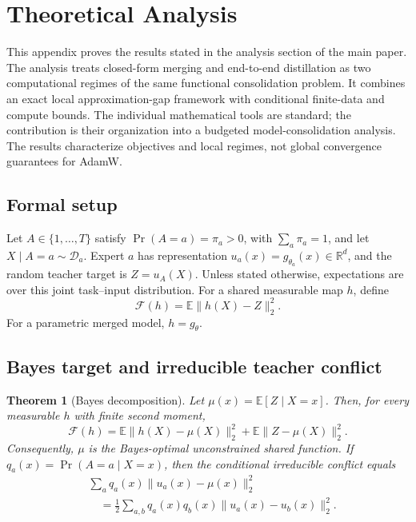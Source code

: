 \documentclass[letterpaper]{article} %
\theoremstyle{plain}
\newtheorem{theorem}{Theorem}
\theoremstyle{definition}
\begin{document}
\section{Theoretical Analysis}
\label{app:theory}

This appendix proves the results stated in the analysis section of the main paper.
The analysis treats closed-form merging and end-to-end distillation as two computational regimes of the same functional consolidation problem.
It combines an exact local approximation-gap framework with conditional finite-data and compute bounds.
The individual mathematical tools are standard; the contribution is their organization into a budgeted model-consolidation analysis.
The results characterize objectives and local regimes, not global convergence guarantees for AdamW.

\subsection{Formal setup}
Let $A\in\{1,\ldots,T\}$ satisfy $\Pr(A=a)=\pi_a>0$, with $\sum_a\pi_a=1$, and let $X\mid A=a\sim\mathcal D_a$.
Expert $a$ has representation $u_a(x)=g_{\theta_a}(x)\in\mathbb R^d$, and the random teacher target is $Z=u_A(X)$.
Unless stated otherwise, expectations are over this joint task--input distribution.
For a shared measurable map $h$, define
\begin{equation}
    \mathcal F(h)=\mathbb E\|h(X)-Z\|_2^2.
    \label{eq:appendix-F}
\end{equation}
For a parametric merged model, $h=g_\theta$.

\subsection{Bayes target and irreducible teacher conflict}
\label{app:bayes}

\begin{theorem}[Bayes decomposition]
\label{thm:bayes}
Let $\mu(x)=\mathbb E[Z\mid X=x]$.
Then, for every measurable $h$ with finite second moment,
\begin{equation}
\mathcal F(h)=
\mathbb E\|h(X)-\mu(X)\|_2^2
+\mathbb E\|Z-\mu(X)\|_2^2.
\label{eq:bayes-decomposition}
\end{equation}
Consequently, $\mu$ is the Bayes-optimal unconstrained shared function.
If $q_a(x)=\Pr(A=a\mid X=x)$, then the conditional irreducible conflict equals
\begin{equation}
\begin{aligned}
&\sum_a q_a(x)\|u_a(x)-\mu(x)\|_2^2 \\
&\quad=\frac12\sum_{a,b}q_a(x)q_b(x)
\|u_a(x)-u_b(x)\|_2^2.
\end{aligned}
\label{eq:pairwise-conflict}
\end{equation}
\end{theorem}
\end{document}
